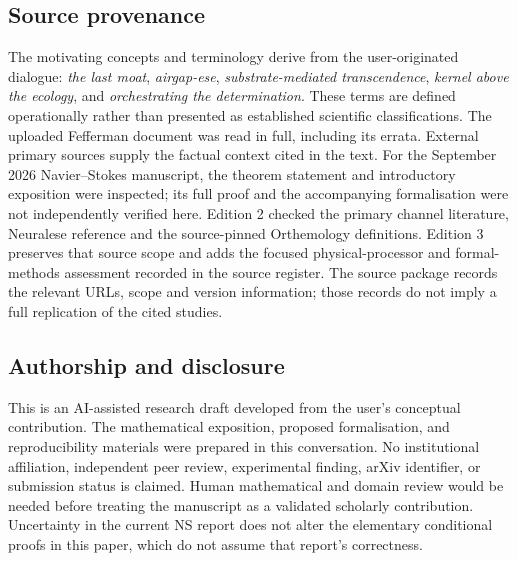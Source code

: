 \documentclass[11pt,a4paper]{article}
\theoremstyle{definition}
\theoremstyle{remark}
\begin{document}
\subsection*{Source provenance}
The motivating concepts and terminology derive from the user-originated dialogue: \emph{the last moat}, \emph{airgap-ese}, \emph{substrate-mediated transcendence}, \emph{kernel above the ecology}, and \emph{orchestrating the determination}. These terms are defined operationally rather than presented as established scientific classifications. The uploaded Fefferman document was read in full, including its errata. External primary sources supply the factual context cited in the text. For the September 2026 Navier--Stokes manuscript, the theorem statement and introductory exposition were inspected; its full proof and the accompanying formalisation were not independently verified here. Edition 2 checked the primary channel literature, Neuralese reference and the source-pinned Orthemology definitions. Edition 3 preserves that source scope and adds the focused physical-processor and formal-methods assessment recorded in the source register. The source package records the relevant URLs, scope and version information; those records do not imply a full replication of the cited studies.

\subsection*{Authorship and disclosure}
This is an AI-assisted research draft developed from the user's conceptual contribution. The mathematical exposition, proposed formalisation, and reproducibility materials were prepared in this conversation. No institutional affiliation, independent peer review, experimental finding, arXiv identifier, or submission status is claimed. Human mathematical and domain review would be needed before treating the manuscript as a validated scholarly contribution. Uncertainty in the current NS report does not alter the elementary conditional proofs in this paper, which do not assume that report's correctness.


\end{document}
